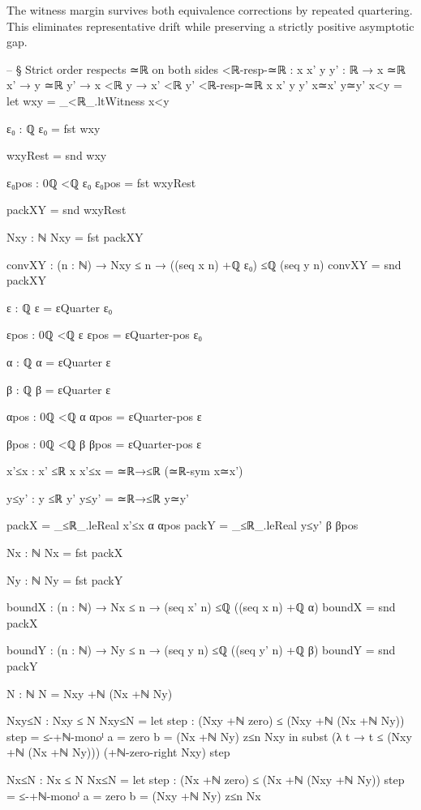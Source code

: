 \documentclass[11pt,a4paper]{book}
\begin{document}
The witness margin survives both equivalence corrections by repeated quartering. This eliminates representative drift while preserving a strictly positive asymptotic gap.

\begin{code}

-- § Strict order respects ≃ℝ on both sides
<ℝ-resp-≃ℝ : {x x' y y' : ℝ} → x ≃ℝ x' → y ≃ℝ y' → x <ℝ y → x' <ℝ y'
<ℝ-resp-≃ℝ {x} {x'} {y} {y'} x≃x' y≃y' x<y =
  let
    wxy = _<ℝ_.ltWitness x<y

    ε₀ : ℚ
    ε₀ = fst wxy

    wxyRest = snd wxy

    ε₀pos : 0ℚ <ℚ ε₀
    ε₀pos = fst wxyRest

    packXY = snd wxyRest

    Nxy : ℕ
    Nxy = fst packXY

    convXY : (n : ℕ) → Nxy ≤ n → ((seq x n) +ℚ ε₀) ≤ℚ (seq y n)
    convXY = snd packXY

    ε : ℚ
    ε = εQuarter ε₀

    εpos : 0ℚ <ℚ ε
    εpos = εQuarter-pos ε₀

    α : ℚ
    α = εQuarter ε

    β : ℚ
    β = εQuarter ε

    αpos : 0ℚ <ℚ α
    αpos = εQuarter-pos ε

    βpos : 0ℚ <ℚ β
    βpos = εQuarter-pos ε

    x'≤x : x' ≤ℝ x
    x'≤x = ≃ℝ→≤ℝ (≃ℝ-sym x≃x')

    y≤y' : y ≤ℝ y'
    y≤y' = ≃ℝ→≤ℝ y≃y'

    packX = _≤ℝ_.leReal x'≤x α αpos
    packY = _≤ℝ_.leReal y≤y' β βpos

    Nx : ℕ
    Nx = fst packX

    Ny : ℕ
    Ny = fst packY

    boundX : (n : ℕ) → Nx ≤ n → (seq x' n) ≤ℚ ((seq x n) +ℚ α)
    boundX = snd packX

    boundY : (n : ℕ) → Ny ≤ n → (seq y n) ≤ℚ ((seq y' n) +ℚ β)
    boundY = snd packY

    N : ℕ
    N = Nxy +ℕ (Nx +ℕ Ny)

    Nxy≤N : Nxy ≤ N
    Nxy≤N =
      let
        step : (Nxy +ℕ zero) ≤ (Nxy +ℕ (Nx +ℕ Ny))
        step = ≤-+ℕ-monoˡ {a = zero} {b = (Nx +ℕ Ny)} z≤n Nxy
      in
      subst (λ t → t ≤ (Nxy +ℕ (Nx +ℕ Ny))) (+ℕ-zero-right Nxy) step

    Nx≤N : Nx ≤ N
    Nx≤N =
      let
        step : (Nx +ℕ zero) ≤ (Nx +ℕ (Nxy +ℕ Ny))
        step = ≤-+ℕ-monoˡ {a = zero} {b = (Nxy +ℕ Ny)} z≤n Nx


\end{code}
\end{document}

